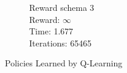 \documentclass[a4paper,10pt]{article}
\begin{document}
\begin{figure}[h!]
\begin{subfigure}[b]{0.3\textwidth}
                \caption{Reward schema 3 \\
                Reward: $\infty$\\
                Time: 1.677 \\
                Iterations: 65465 }
                \label{fig:mouse}
        \end{subfigure}
        \caption{Policies Learned by Q-Learning}\label{fig:animals}
\end{figure}
\end{document}
